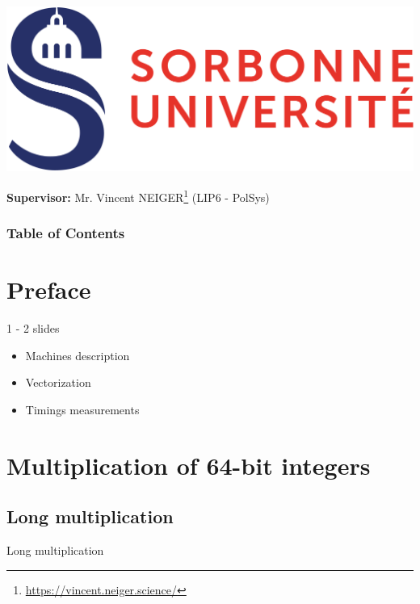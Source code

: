 \documentclass{beamer}
\begin{document}
\begin{frame}[plain]
	\begin{center} 
		\includegraphics[scale=0.1]{su.png}
    \end{center}

    \titlepage
    
    \vfill
    \begin{flushleft}
        {\small
            \textbf{Supervisor:} Mr. Vincent NEIGER\footnote{\url{https://vincent.neiger.science/}} (LIP6 - PolSys)\\
        }
    \end{flushleft}
\end{frame}

\begin{frame}
    \frametitle{Table of Contents}
    \tableofcontents
\end{frame}

\section{Preface}
\begin{frame}
    
    1 - 2 slides
    \begin{itemize}
        \item Machines description
        \item Vectorization
        \item Timings measurements
    \end{itemize}
\end{frame}

\section{Multiplication of 64-bit integers}
\subsection{Long multiplication}
\begin{frame}
    Long multiplication
\end{frame}
\end{document}
